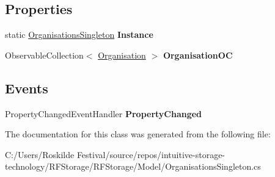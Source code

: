 \subsection*{Properties}
\begin{DoxyCompactItemize}
\item 
\mbox{\label{class_r_f_storage_1_1_model_1_1_organisations_singleton_a90156b767153cdffc9babd801ca5ec70}} 
static \mbox{\hyperlink{class_r_f_storage_1_1_model_1_1_organisations_singleton}{Organisations\+Singleton}} {\bfseries Instance}
\item 
\mbox{\label{class_r_f_storage_1_1_model_1_1_organisations_singleton_aca042115685c93582fc2087e0a8c20e3}} 
Observable\+Collection$<$ \mbox{\hyperlink{class_r_f_storage_1_1_model_1_1_organisation}{Organisation}} $>$ {\bfseries Organisation\+OC}
\end{DoxyCompactItemize}
\subsection*{Events}
\begin{DoxyCompactItemize}
\item 
\mbox{\label{class_r_f_storage_1_1_model_1_1_organisations_singleton_aa8d2d526d9cc843d834db22528a9564d}} 
Property\+Changed\+Event\+Handler {\bfseries Property\+Changed}
\end{DoxyCompactItemize}


The documentation for this class was generated from the following file\+:\begin{DoxyCompactItemize}
\item 
C\+:/\+Users/\+Roskilde Festival/source/repos/intuitive-\/storage-\/technology/\+R\+F\+Storage/\+R\+F\+Storage/\+Model/Organisations\+Singleton.\+cs\end{DoxyCompactItemize}

